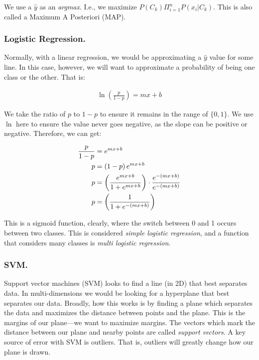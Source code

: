We use a $\hat{y}$ as an \textit{argmax}. I.e., we maximize $P(C_k)\Pi^n_{i=1}P(x_i|C_k)$. This is also called a Maximum A Posteriori (MAP). 

\subsubsection{Logistic Regression.}

Normally, with a linear regression, we would be approximating a $\hat{y}$ value for some line. In this case, however, we will want to approximate a probability of being one class or the other. That is: 

\begin{equation}
\begin{split}
    \ln(\frac{p}{1-p}) = mx + b        
\end{split}
\end{equation}

We take the ratio of $p$ to $1-p$ to ensure it remains in the range of $\{0,1\}$. We use $\ln$ here to ensure the value never goes negative, as the slope can be positive or negative. Therefore, we can get: 

\begin{equation}
\begin{split}
    \frac{p}{1-p} &= e^{mx + b} \\
    p &= \left(1-p\right)e^{mx + b} \\
    p &= \left(\frac{e^{mx+b}}{1 + e^{mx+b}}\right) \cdot \frac{e^{-(mx+b)}}{e^{-(mx+b)}} \\
    p &= \left(\frac{1}{1 + e^{-(mx+b)}}\right) \\
\end{split}
\end{equation}

This is a sigmoid function, clearly, where the switch between 0 and 1 occurs between two classes. This is considered \textit{simple logistic regression}, and a function that considers many classes is \textit{multi logistic regression}. 



\subsubsection{SVM.}

Support vector machines (SVM) looks to find a line (in 2D) that best separates data. In multi-dimensions we would be looking for a hyperplane that best separates our data. Broadly, how this works is by finding a plane which separates the data and maximizes the distance between points and the plane. This is the margins of our plane---we want to maximize margins. The vectors which mark the distance between our plane and nearby points are called \textit{support vectors}. A key source of error with SVM is outliers. That is, outliers will greatly change how our plane is drawn.\newline

